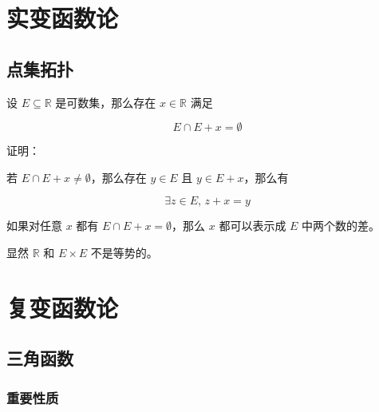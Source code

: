 \documentclass[12pt,a4paper]{ctexart}
\begin{document}
\section{实变函数论}

\subsection{点集拓扑}

设 $E \subseteq \mathbb{R}$ 是可数集，那么存在 $x \in \mathbb{R}$ 满足

\[
E \cap E + x = \emptyset
\]

证明：

若 $E \cap E +x \ne \emptyset$，那么存在 $y \in E$ 且 $y \in E + x$，那么有

\[
\exists z \in E,\, z + x = y
\]

如果对任意 $x$ 都有 $E \cap E + x = \emptyset$，那么 $x$ 都可以表示成 $E$ 中两个数的差。

显然 $\mathbb{R}$ 和 $E \times E$ 不是等势的。


\section{复变函数论}

\subsection{三角函数}

\subsubsection{重要性质}
\end{document}
